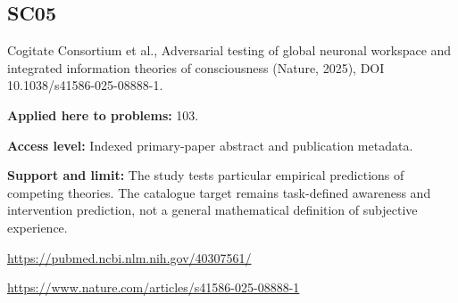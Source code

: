 \documentclass[11pt]{article}
\begin{document}
\subsection*{SC05}\label{check:SC05}

Cogitate Consortium et al., Adversarial testing of global neuronal workspace and integrated information theories of consciousness (Nature, 2025), DOI 10.1038/s41586-025-08888-1.

\textbf{Applied here to problems:} 103.

\textbf{Access level:} Indexed primary-paper abstract and publication metadata.

\textbf{Support and limit:} The study tests particular empirical predictions of competing theories. The catalogue target remains task-defined awareness and intervention prediction, not a general mathematical definition of subjective experience.

\url{https://pubmed.ncbi.nlm.nih.gov/40307561/}

\url{https://www.nature.com/articles/s41586-025-08888-1}
\end{document}

